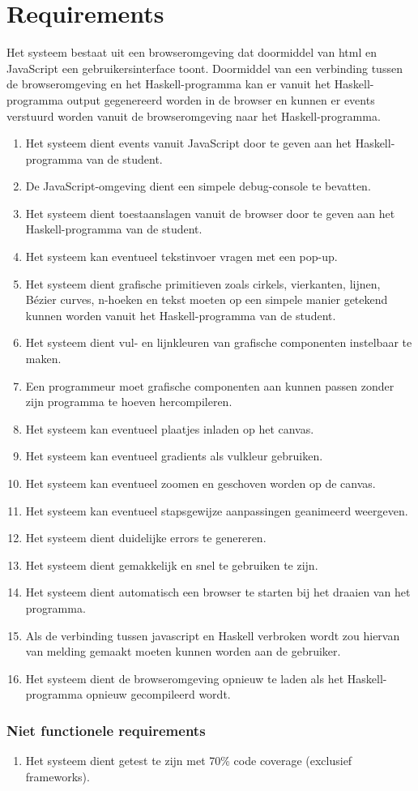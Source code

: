 \section{Requirements} \label{sec:requirements}
Het systeem bestaat uit een browseromgeving dat doormiddel van html en JavaScript een gebruikersinterface toont. Doormiddel van een verbinding tussen de browseromgeving en het Haskell-programma kan er vanuit het Haskell-programma output gegenereerd worden in de browser en kunnen er events verstuurd worden vanuit de browseromgeving naar het Haskell-programma.


\begin{enumerate}[{R}1]
	\item Het systeem dient events vanuit JavaScript door te geven aan het Haskell-programma van de student.
	\item De JavaScript-omgeving dient een simpele debug-console te bevatten.
	\item Het systeem dient toestaanslagen vanuit de browser door te geven aan het Haskell-programma van de student.
	\item Het systeem kan eventueel tekstinvoer vragen met een pop-up.
	\item Het systeem dient grafische primitieven zoals cirkels, vierkanten, lijnen, Bézier curves, n-hoeken en tekst moeten op een simpele manier getekend kunnen worden vanuit het Haskell-programma van de student.
	\item Het systeem dient vul- en lijnkleuren van grafische componenten instelbaar te maken.
	\item Een programmeur moet grafische componenten aan kunnen passen zonder zijn programma te hoeven hercompileren.
	\item Het systeem kan eventueel plaatjes inladen op het canvas.
	\item Het systeem kan eventueel gradients als vulkleur gebruiken.
	\item Het systeem kan eventueel zoomen en geschoven worden op de canvas.
	\item Het systeem kan eventueel stapsgewijze aanpassingen geanimeerd weergeven.
	\item Het systeem dient duidelijke errors te genereren.
	\item Het systeem dient gemakkelijk en snel te gebruiken te zijn.
	\item Het systeem dient automatisch een browser te starten bij het draaien van het programma.
		\item Als de verbinding tussen javascript en Haskell verbroken wordt zou hiervan van melding gemaakt moeten kunnen worden aan de gebruiker. 
	\item Het systeem dient de browseromgeving opnieuw te laden als het Haskell-programma opnieuw gecompileerd wordt.

\end{enumerate}
\subsubsection{Niet functionele requirements}
\begin{enumerate}[{R}17]
	\item Het systeem dient getest te zijn met 70\% code coverage (exclusief frameworks).
\end{enumerate}